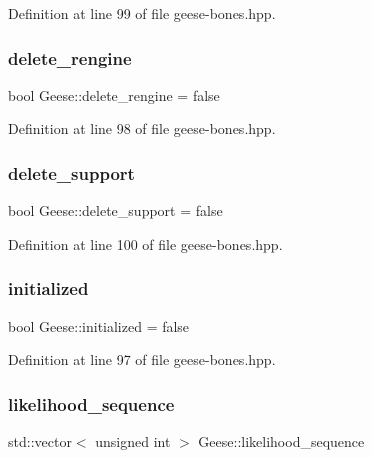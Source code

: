 Definition at line 99 of file geese-\/bones.\+hpp.

\mbox{\label{class_geese_a1e614555901572392026f85ff1a6b3c8}} 
\subsubsection{\texorpdfstring{delete\+\_\+rengine}{delete\_rengine}}
{\footnotesize\ttfamily bool Geese\+::delete\+\_\+rengine = false}



Definition at line 98 of file geese-\/bones.\+hpp.

\mbox{\label{class_geese_a914996ac39160fb46e1ce6d70609a36a}} 
\subsubsection{\texorpdfstring{delete\+\_\+support}{delete\_support}}
{\footnotesize\ttfamily bool Geese\+::delete\+\_\+support = false}



Definition at line 100 of file geese-\/bones.\+hpp.

\mbox{\label{class_geese_aa3c3181a20e367fe13e92180c83f84c0}} 
\subsubsection{\texorpdfstring{initialized}{initialized}}
{\footnotesize\ttfamily bool Geese\+::initialized = false}



Definition at line 97 of file geese-\/bones.\+hpp.

\mbox{\label{class_geese_a07298ddbdad40b6ae33649f64b12fe00}} 
\subsubsection{\texorpdfstring{likelihood\+\_\+sequence}{likelihood\_sequence}}
{\footnotesize\ttfamily std\+::vector$<$ unsigned int $>$ Geese\+::likelihood\+\_\+sequence}



